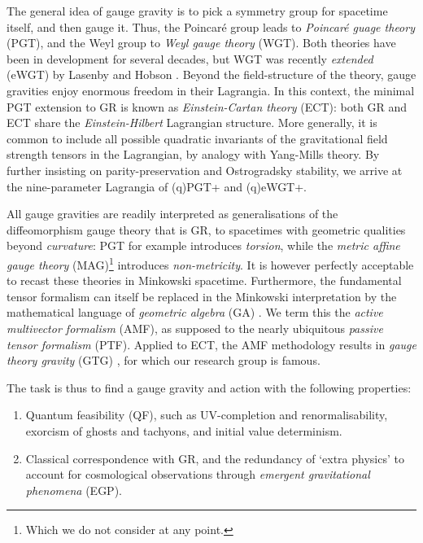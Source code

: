 \documentclass[twoside]{report}
\begin{document}
\begin{multicols}{2}
The general idea of gauge gravity is to pick a symmetry group for spacetime itself, and then gauge it. Thus, the Poincar\'e group leads to \textit{Poincar\'e guage theory} (PGT), and the Weyl group to \textit{Weyl gauge theory} (WGT). Both theories have been in development for several decades, but WGT was recently \textit{extended} (eWGT) by Lasenby and Hobson \cite{lasenby-hobson-2016}. Beyond the field-structure of the theory, gauge gravities enjoy enormous freedom in their Lagrangia. In this context, the minimal PGT extension to GR is known as \textit{Einstein-Cartan theory} (ECT): both GR and ECT share the \textit{Einstein-Hilbert} Lagrangian structure. More generally, it is common to include all possible quadratic invariants of the gravitational field strength tensors in the Lagrangian, by analogy with Yang-Mills theory. By further insisting on parity-preservation and Ostrogradsky stability, we arrive at the nine-parameter Lagrangia of (q)PGT+ and (q)eWGT+. 

All gauge gravities are readily interpreted as generalisations of the diffeomorphism gauge theory that is GR, to spacetimes with geometric qualities beyond \textit{curvature}: PGT for example introduces \textit{torsion}, while the \textit{metric affine gauge theory} (MAG)\footnote{Which we do not consider at any point.} introduces \textit{non-metricity}. It is however perfectly acceptable to recast these theories in Minkowski spacetime. Furthermore, the fundamental tensor formalism can itself be replaced in the Minkowski interpretation by the mathematical language of \textit{geometric algebra} (GA) \cite{doran-lasenby}. We term this the \textit{active multivector formalism} (AMF), as supposed to the nearly ubiquitous \textit{passive tensor formalism} (PTF). Applied to ECT, the AMF methodology results in \textit{gauge theory gravity} (GTG) \cite{1998RSPTA.356..487L}, for which our research group is famous. 

The task is thus to find a gauge gravity and action with the following properties:
\begin{enumerate}[resume]
  \item Quantum feasibility (QF), such as UV-completion and renormalisability, exorcism of ghosts and tachyons, and initial value determinism.
  \item Classical correspondence with GR, and the redundancy of `extra physics' to account for cosmological observations through \textit{emergent gravitational phenomena} (EGP).
\end{enumerate}


\end{multicols}
\end{document}

